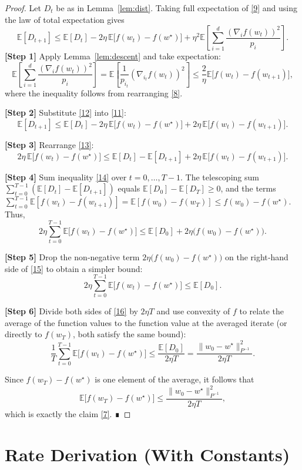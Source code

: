 \documentclass{article}
\newcommand{\E}{\mathbb{E}}
\begin{document}
\begin{proof}
Let $D_t$ be as in Lemma~\ref{lem:dist}. Taking full expectation of
\eqref{9} and using the law of total expectation gives
\[
\E[D_{t+1}]\le \E[D_t]-2\eta\,\E\!\big[f(w_t)-f(w^\star)\big]
      +\eta^{2}\E\!\left[\sum_{i=1}^{d}\frac{(\nabla_i f(w_t))^{2}}{p_i}\right].
\tag{11}
\]
\textbf{[Step 1]}  Apply Lemma~\ref{lem:descent} and take expectation:
\[
\E\!\left[\sum_{i=1}^{d}\frac{(\nabla_i f(w_t))^{2}}{p_i}\right]
   =\E\!\left[\frac{1}{p_{i_t}}(\nabla_{i_t}f(w_t))^{2}\right]
   \le \frac{2}{\eta}\E\!\big[f(w_t)-f(w_{t+1})\big],
\tag{12}
\]
where the inequality follows from rearranging \eqref{8}.

\textbf{[Step 2]}  Substitute \eqref{12} into \eqref{11}:
\[
\E[D_{t+1}]
\le \E[D_t]-2\eta\,\E\!\big[f(w_t)-f(w^\star)\big]
   +2\eta\,\E\!\big[f(w_t)-f(w_{t+1})\big].
\tag{13}
\]

\textbf{[Step 3]}  Rearrange \eqref{13}:
\[
2\eta\,\E\!\big[f(w_t)-f(w^\star)\big]
\le \E[D_t]-\E[D_{t+1}]
   +2\eta\,\E\!\big[f(w_t)-f(w_{t+1})\big].
\tag{14}
\]

\textbf{[Step 4]}  Sum inequality \eqref{14} over $t=0,\dots,T-1$.
The telescoping sum $\sum_{t=0}^{T-1}(\E[D_t]-\E[D_{t+1}])$ equals
$\E[D_0]-\E[D_T]\ge 0$, and the terms
$\sum_{t=0}^{T-1}\E[f(w_t)-f(w_{t+1})]=\E[f(w_0)-f(w_T)]\le f(w_0)-f(w^\star)$.
Thus,
\[
2\eta\sum_{t=0}^{T-1}\E\!\big[f(w_t)-f(w^\star)\big]
\le \E[D_0] +2\eta\big(f(w_0)-f(w^\star)\big).
\tag{15}
\]

\textbf{[Step 5]}  Drop the non‑negative term $2\eta\big(f(w_0)-f(w^\star)\big)$ on the
right‑hand side of \eqref{15} to obtain a simpler bound:
\[
2\eta\sum_{t=0}^{T-1}\E\!\big[f(w_t)-f(w^\star)\big]\le \E[D_0].
\tag{16}
\]

\textbf{[Step 6]}  Divide both sides of \eqref{16} by $2\eta T$ and use convexity
of $f$ to relate the average of the function values to the function value at
the averaged iterate (or directly to $f(w_T)$, both satisfy the same bound):
\[
\frac{1}{T}\sum_{t=0}^{T-1}\E\!\big[f(w_t)-f(w^\star)\big]
\le \frac{\E[D_0]}{2\eta T}
   =\frac{\|w_0-w^\star\|_{P^{-1}}^{2}}{2\eta T}.
\tag{17}
\]

Since $f(w_T)-f(w^\star)$ is one element of the average, it follows that
\[
\E\big[f(w_T)-f(w^\star)\big]\le\frac{\|w_0-w^\star\|_{P^{-1}}^{2}}{2\eta T},
\]
which is exactly the claim \eqref{7}.  ∎
\end{proof}

\section*{Rate Derivation (With Constants)}
\end{document}
